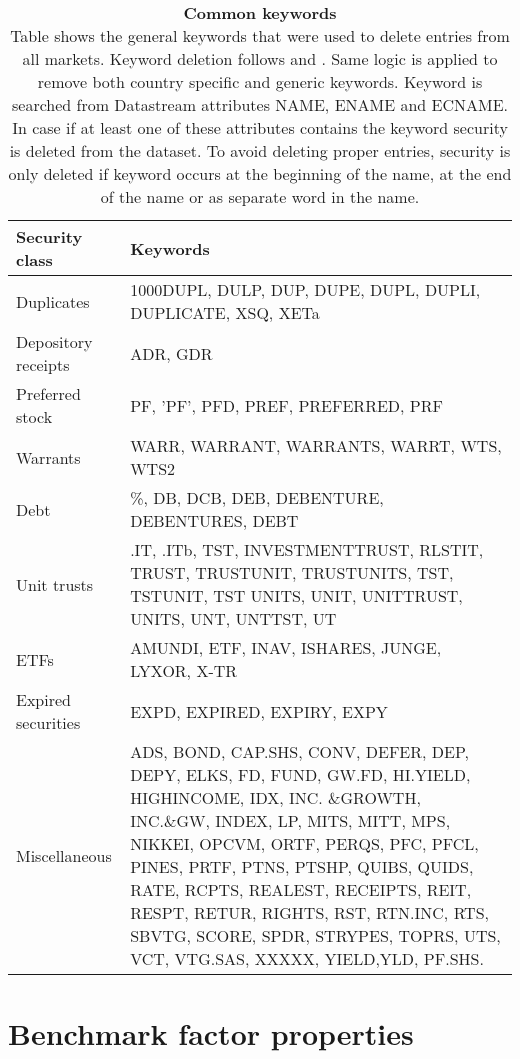 \documentclass[12pt]{article}
\begin{document}
\begin{table}[ht] 
\footnotesize
\caption[Common keywords]{\textbf{Common keywords}\\ Table shows the general keywords that were used to delete entries from all markets. Keyword deletion follows \protect\citet{Ince2006} and \protect\citet{HANAUER2023106712}. Same logic is applied to remove both country specific and generic keywords. Keyword is searched from Datastream attributes NAME, ENAME and ECNAME. In case if at least one of these attributes contains the keyword security is deleted from the dataset. To avoid deleting proper entries, security is only deleted if keyword occurs at the beginning of the name, at the end of the name or as separate word in the name.}
 \label{table:GeneralKeywords}
\centering
\begin{tabularx}{\textwidth}{l X}
\toprule
Security class 	& Keywords \\
\midrule
Duplicates 		& 1000DUPL, DULP, DUP, DUPE, DUPL, DUPLI, DUPLICATE, XSQ, XETa  \\[1ex]
Depository receipts	& ADR, GDR \\[1ex]
Preferred stock 	&  PF, ’PF’, PFD, PREF, PREFERRED, PRF\\ [1ex]
Warrants 			&  WARR, WARRANT, WARRANTS, WARRT, WTS, WTS2\\[1ex]
Debt 			& \%, DB, DCB, DEB, DEBENTURE, DEBENTURES, DEBT\\[1ex]
Unit trusts 		& .IT, .ITb, TST, INVESTMENTTRUST, RLSTIT, TRUST, TRUSTUNIT, TRUSTUNITS, TST, TSTUNIT, TST UNITS, UNIT, UNITTRUST, UNITS, UNT, UNTTST, UT\\[1ex]
ETFs 			& AMUNDI, ETF, INAV, ISHARES, JUNGE, LYXOR, X-TR\\[1ex]
Expired securities 	& EXPD, EXPIRED, EXPIRY, EXPY\\[1ex]
Miscellaneous 		& ADS, BOND, CAP.SHS, CONV, DEFER, DEP, DEPY, ELKS, FD, FUND, GW.FD, HI.YIELD, HIGHINCOME, IDX, INC.								\&GROWTH, INC.\&GW, INDEX, LP, MITS, MITT, MPS, NIKKEI, OPCVM, ORTF, PERQS, 												PFC, PFCL, PINES, PRTF, PTNS, PTSHP, QUIBS, QUIDS, RATE, RCPTS, REALEST, RECEIPTS, REIT, RESPT, 								RETUR, RIGHTS, RST, RTN.INC, RTS, SBVTG, SCORE, SPDR, STRYPES, TOPRS, UTS, VCT, VTG.SAS, 									XXXXX, YIELD,YLD, PF.SHS.\\
 \bottomrule
 \end{tabularx}
 \end{table} 

\clearpage

\section{Benchmark factor properties} \label{BenchmarkFactorProperties}
\renewcommand{\thefigure}{B.\arabic{figure}}
\setcounter{figure}{0}
\renewcommand{\thetable}{B.\arabic{table}}
\setcounter{table}{0}
\end{document}
